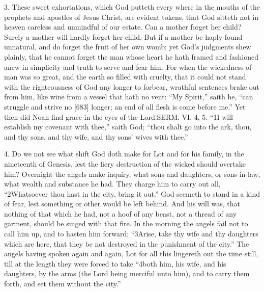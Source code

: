3. These sweet exhortations, which God putteth every where in the mouths of the prophets and apostles of Jesus Christ, are evident tokens, that God sitteth not in heaven careless and unmindful of our estate. Can a mother forget her child? Surely a mother will hardly forget her child. But if a mother be haply found unnatural, and do forget the fruit of her own womb; yet God’s judgments shew plainly, that he cannot forget the man whose heart he hath framed and fashioned anew in simplicity and truth to serve and fear him. For when the wickedness of man was so great, and the earth so filled with cruelty, that it could not stand with the righteousness of God any longer to forbear, wrathful sentences brake out from him, like wine from a vessel that hath no vent: “My Spirit,” saith he, “can struggle and strive no [683] longer; an end of all flesh is come before me.” Yet then did Noah find grace in the eyes of the Lord:SERM. VI. 4, 5. “1I will establish my covenant with thee,” saith God; “thou shalt go into the ark, thou, and thy sons, and thy wife, and thy sons’ wives with thee.”

4. Do we not see what shift God doth make for Lot and for his family, in the nineteenth of Genesis, lest the fiery destruction of the wicked should overtake him? Overnight the angels make inquiry, what sons and daughters, or sons-in-law, what wealth and substance he had. They charge him to carry out all, “2Whatsoever thou hast in the city, bring it out.” God seemeth to stand in a kind of fear, lest something or other would be left behind. And his will was, that nothing of that which he had, not a hoof of any beast, not a thread of any garment, should be singed with that fire. In the morning the angels fail not to call him up, and to hasten him forward; “3Arise, take thy wife and thy daughters which are here, that they be not destroyed in the punishment of the city.” The angels having spoken again and again, Lot for all this lingereth out the time still, till at the length they were forced to take “4both him, his wife, and his daughters, by the arms (the Lord being merciful unto him), and to carry them forth, and set them without the city.”

